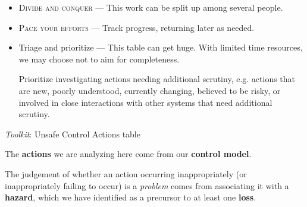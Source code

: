 \documentclass[a4paper]{tufte-book}
\begin{document}
\begin{landscape}
\begin{multicols}{2}

\begin{itemize}
\setlength{\itemsep}{0pt}
\setlength{\parskip}{.25em}
\item \textsc{Divide and conquer} --- This work can be split up among several people.
\item \textsc{Pace your efforts} --- Track progress, returning later as needed.
\item Triage and prioritize --- This table can get huge. With limited time resources, we may choose not to aim for completeness.

Prioritize investigating actions needing additional scrutiny, e.g. actions that are new, poorly understood, currently changing, believed to be risky, or involved in close interactions with other systems that need additional scrutiny.
\end{itemize}  

\emph{Toolkit}: Unsafe Control Actions table


The \textbf{actions} we are analyzing here come from our \textbf{control model}.

The judgement of whether an action occurring inappropriately (or inappropriately failing to occur) is a \emph{problem} comes from associating it with a \textbf{hazard}, which we have identified as a precursor to at least one \textbf{loss}.

\end{multicols}
\end{landscape}
\end{document}
